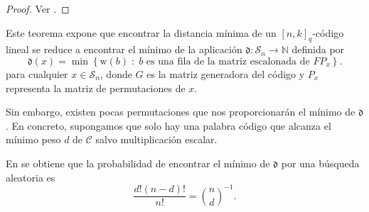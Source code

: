 \begin{proof}
    Ver \cite[Página 4]{Cuellar_etal}.
\end{proof}

Este teorema expone que encontrar la distancia mínima de un $[n, k]_q$-código lineal se reduce a encontrar el mínimo de la aplicación $\mathfrak d : \mathcal{S}_n \rightarrow \mathbb{N}$ definida por
\[
    \mathfrak d (x) = \min \left\{ \text{w}(b) \; : \; b \text{ es una fila de la matriz escalonada de } FP_x \right\}.
\]
para cualquier $x \in \mathcal{S}_n$, donde $G$ es la matriz generadora del código y $P_x$ representa la matriz de permutaciones de $x$.

Sin embargo, existen pocas permutaciones que nos proporcionarán el mínimo de $\mathfrak{d}$. En concreto, supongamos que solo hay una palabra código que alcanza el mínimo peso $d$ de $\mathcal{C}$ salvo multiplicación escalar.

En \cite{Cuellar_etal} se obtiene que la probabilidad de encontrar el mínimo de $\mathfrak{d}$ por una búsqueda aleatoria es
\[
    \frac{d! (n-d)!}{n!} = {n \choose d}^{-1}.
\]

